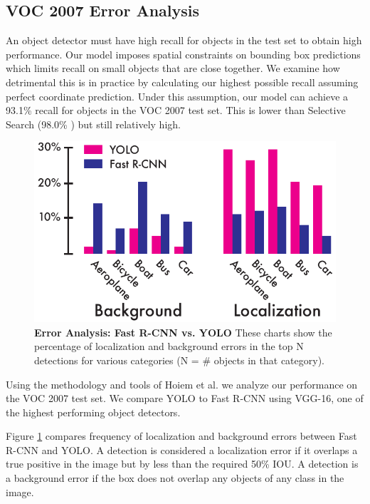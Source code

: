 \documentclass{article} %
\begin{document}
\subsection{VOC 2007 Error Analysis}
\label{error}

An object detector must have high recall for objects in the test set to obtain high performance. Our model imposes spatial constraints on bounding box predictions which limits recall on small objects that are close together. We examine how detrimental this is in practice by calculating our highest possible recall assuming perfect coordinate prediction. Under this assumption, our model can achieve a 93.1\% recall for objects in the VOC 2007 test set. This is lower than Selective Search (98.0\% \cite{uijlings2013selective}) but still relatively high.

\begin{figure}
      \centering
        \includegraphics[width=\linewidth]{errors}
      \caption{\textbf{Error Analysis: Fast R-CNN vs. YOLO} These charts show the percentage of localization and background errors in the top N detections for various categories (N = \# objects in that category).}
      \label{errors}
   \end{figure}

Using the methodology and tools of Hoiem et al. \cite{hoiem2012diagnosing} we analyze our performance on the VOC 2007 test set. We compare YOLO to Fast R-CNN using VGG-16, one of the highest performing object detectors.

Figure \ref{errors} compares frequency of localization and background errors between Fast R-CNN and YOLO. A detection is considered a localization error if it overlaps a true positive in the image but by less than the required 50\% IOU. A detection is a background error if the box does not overlap any objects of any class in the image.
\end{document}
